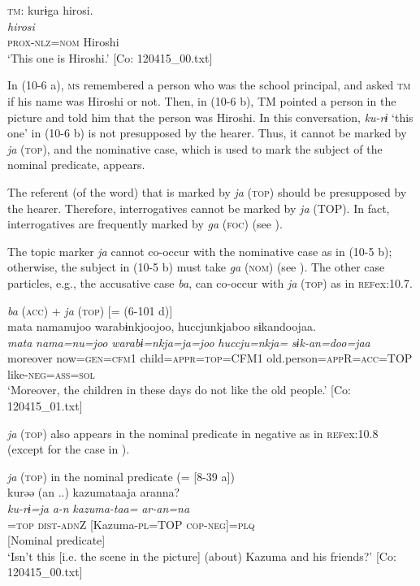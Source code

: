   \ex  \textsc{tm}: \glll    kurɨga  hirosi.\\
      \textit{}  \textit{hirosi}\\
      \textsc{prox}-\textsc{nlz}=\textsc{nom}  Hiroshi\\
      \glt       ‘This one is Hiroshi.’ [Co: 120415\_00.txt]
    \z
\z

In (10-6 a), \textsc{ms} remembered a person who was the school principal, and asked \textsc{tm} if his name was Hiroshi or not. Then, in (10-6 b), TM pointed a person in the picture and told him that the person was Hiroshi. In this conversation, \textit{ku-rɨ} ‘this one’ in (10-6 b) is not presupposed by the hearer. Thus, it cannot be marked by \textit{ja} (\textsc{top}), and the nominative case, which is used to mark the subject of the nominal predicate, appears.

  The referent (of the word) that is marked by \textit{ja} (\textsc{top}) should be presupposed by the hearer. Therefore, interrogatives cannot be marked by \textit{ja} (TOP). In fact, interrogatives are frequently marked by \textit{ga} (\textsc{foc}) (see ).

  The topic marker \textit{ja} cannot co-occur with the nominative case as in (10-5 b); otherwise, the subject in (10-5 b) must take \textit{ga} (\textsc{nom}) (see ). The other case particles, e.g., the accusative case \textit{ba}, can co-occur with \textit{ja} (\textsc{top}) as in \textsc{ref}{ex:10.7}.

\ea\label{ex:10.7}   \textit{ba} (\textsc{acc}) + \textit{ja} (\textsc{top}) [= (6-101 d)]\\
      \glll    mata  namanujoo  warabɨnkjoojoo, huccjunkjaboo  sɨkandoojaa.\\
    \textit{mata}  \textit{nama=nu=joo}  \textit{warabɨ=nkja=ja=joo}    \textit{huccju=nkja=}  \textit{sɨk-an=doo=jaa}\\
    moreover  now=\textsc{gen}=\textsc{cfm}1  child=\textsc{appr}=\textsc{top}=CFM1  old.person=\textsc{app}R=\textsc{acc}=TOP  like-\textsc{neg}=\textsc{ass}=\textsc{sol}\\
\glt     ‘Moreover, the children in these days do not like the old people.’  [Co: 120415\_01.txt]
\z

  \textit{ja} (\textsc{top}) also appears in the nominal predicate in negative as in \textsc{ref}{ex:10.8} (except for the case in ).

\ea\label{ex:10.8}   \textit{ja} (\textsc{top}) in the nominal predicate (= [8-39 a])\\
      \gllll    kurəə  {(an ..)}  kazumataaja  aranna?\\
    \textit{ku-rɨ=ja}  \textit{a-n}  \textit{kazuma-taa=}  \textit{ar-an=na}\\
    [\textsc{prox}-\textsc{nlz}]=\textsc{top}  \textsc{dist}-\textsc{adn}Z  [Kazuma-\textsc{pl}=TOP  \textsc{cop}-\textsc{neg}]=\textsc{plq}\\
    [Subject]    [Nominal predicate]\\
    \glt ‘Isn’t this [i.e. the scene in the picture] (about) Kazuma and his friends?’ [Co: 120415\_00.txt]
\z    

